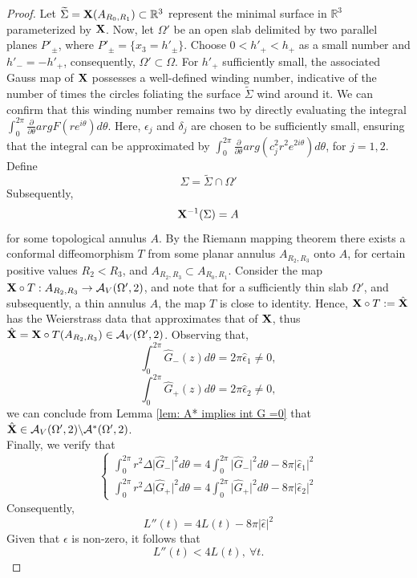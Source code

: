\documentclass[10pt,a4paper]{amsart}
\begin{document}
\begin{proof}
    Let $\widetilde{\Sigma} = \bold{X} (A_{R_0,R_1})  \subset \mathbb{R}^3$
    represent the minimal surface in $\mathbb{R}^3$ parameterized by $\bold{X}$. Now, let $\Omega'$ be an open slab delimited by two parallel planes $P'_{\pm}$, where $P'_{\pm}=\{ x_3=h'_{\pm} \}$. Choose $0<h'_+ < h_+$ as a small number and $h'_-=-h'_+$, consequently, $\Omega' \subset \Omega$. For $h'_+$  sufficiently small, the associated Gauss map of $\bold{X}$ possesses a well-defined winding number, indicative of the number of times the circles foliating the surface $\widetilde{\Sigma}$ wind around it.
    We can confirm that this winding number remains two by directly evaluating the integral $\int_0^{2\pi} \frac{\partial}{\partial \theta} arg F(re^{i\theta}) d\theta$. Here, $\epsilon_j$ and $\delta_j$ are chosen to be sufficiently small, ensuring that the integral can be approximated by $\int_0^{2\pi} \frac{\partial}{\partial \theta} arg (c_j^2r^2e^{2i\theta}) d\theta$, for $j=1,2$. \\
  Define
$$
\Sigma = \widetilde{\Sigma} \cap \Omega'
$$
Subsequently,
$$
\bold{X}^{-1}(\Sigma) = A
$$
for some topological annulus $A$. By the Riemann mapping theorem there exists a conformal diffeomorphism $T$ from some planar annulus $A_{R_2,R_3}$ onto $A$, for certain positive values $R_2<R_3$, and $A_{R_2,R_3} \subset A_{R_0,R_1}$. Consider the map $\bold{X}\circ T: A_{R_2,R_3}\rightarrow \mathcal{A}_V(\Omega',2)$, and note that for a sufficiently thin slab $\Omega'$, and subsequently, a thin annulus $A$, the map $T$ is close to identity. Hence, $\bold{X}\circ T :=\hat{\bold{X}}$ has the Weierstrass data that approximates that of $\bold{X}$, thus $\hat{\bold{X}}=\bold{X}\circ T(A_{R_2,R_3})\in \mathcal{A}_V(\Omega',2)$.  
Observing that, 
$$
\int_0^{2\pi} \hat{G}_-(z)d\theta =2\pi \hat{\epsilon}_1 \neq 0,
$$
$$
\int_0^{2\pi} \hat{G}_+(z)d\theta =2\pi \hat{\epsilon}_2 \neq 0,
$$
we can conclude from Lemma \ref{lem: A* implies int G =0} that $\hat{\bold{X}} \in \mathcal{A}_V(\Omega',2) \backslash \mathcal{A}^*(\Omega',2)$.\\
Finally, we verify that
$$
\begin{cases}
    \int_0^{2\pi}r^2\Delta \vert \hat{G}_-\vert^2 d\theta =4\int_0^{2\pi} \vert \hat{G}_-\vert^2 d\theta -8\pi \vert \hat{\epsilon}_1 \vert^2 \\
    \int_0^{2\pi}r^2\Delta \vert \hat{G}_+\vert^2 d\theta =4\int_0^{2\pi} \vert \hat{G}_+\vert^2 d\theta -8\pi \vert \hat{\epsilon}_2 \vert^2
\end{cases}
$$
 Consequently,
 $$
 L''(t)=4L(t)-8\pi \vert \hat{\epsilon} \vert^2
 $$
 Given that $\epsilon$ is non-zero, it follows that 
 $$ L''(t)<4L(t),\ \forall t.$$
\end{proof}
\end{document}
